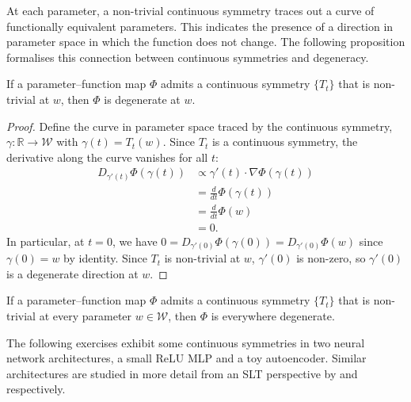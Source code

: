 \documentclass[11pt]{article}
\newcommand{\R}{\mathbb{R}}
\newcommand{\W}{\mathcal{W}}
\begin{document}
At each parameter, a non-trivial continuous symmetry traces out a curve of
functionally equivalent parameters. This indicates the presence of a direction
in parameter space in which the function does not change. The following
proposition formalises this connection between continuous symmetries and
degeneracy.

\begin{proposition}
\label{prop:symmetry-degeneracy}
    If a parameter--function map $\Phi$ admits a continuous symmetry $\{T_t\}$
    that is non-trivial at $w$, then $\Phi$ is degenerate at $w$.
\end{proposition}

\begin{proof}
    Define the curve in parameter space traced by the continuous symmetry,
    $\gamma : \R \to \W$ with $\gamma(t) = T_t(w)$.
    Since $T_t$ is a continuous symmetry, the derivative along the curve
    vanishes for all $t$:
    \begin{align*}
        D_{\gamma'(t)} \Phi(\gamma(t))
        &\propto \gamma'(t) \cdot \nabla \Phi(\gamma(t))
    \\  &= \frac{d}{dt} \Phi(\gamma(t))
            \tag{chain rule}
    \\  &= \frac{d}{dt} \Phi(w)
            \tag{symmetry, $\Phi \circ T_t = \Phi$}
    \\  &= 0.
            \tag{$\Phi(w)$ is constant in $t$}
    \end{align*}
    In particular, at $t=0$, we have
        $0 = D_{\gamma'(0)} \Phi(\gamma(0)) = D_{\gamma'(0)} \Phi(w)$
    since $\gamma(0) = w$ by identity. Since $T_t$ is non-trivial at $w$,
    $\gamma'(0)$ is non-zero, so $\gamma'(0)$ is a degenerate direction at $w$.
\end{proof}

\begin{corollary}
    If a parameter--function map $\Phi$ admits a continuous symmetry $\{T_t\}$
    that is non-trivial at every parameter $w \in \W$, then $\Phi$ is
    everywhere degenerate.
\end{corollary}

The following exercises exhibit some continuous symmetries in two neural
network architectures, a small ReLU MLP and a toy autoencoder. Similar
architectures are studied in more detail from an SLT perspective by
\citet{Carroll2021} and \citet{Chen+2023} respectively.
\end{document}

